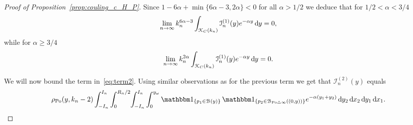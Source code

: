 \begin{proof}[Proof of Proposition~\ref{prop:couling_c_H_P}]
Since $1 - 6\alpha + \min\{6\alpha - 3, 2\alpha\} < 0$ for all $\alpha > 1/2$ we deduce that for $1/2 < \alpha < 3/4$
\[
	\lim_{n \to \infty} k_n^{6\alpha - 3} 
	\int_{{\mathcal K}_{C}(k_n)} \mathcal{I}_n^{(1)}(y) e^{-\alpha y} \operatorname{\mathrm{d}\hspace{-2pt}} y = 0,
\]
while for $\alpha \ge 3/4$
\[
	\lim_{n \to \infty} k_n^{2\alpha}  
		\int_{{\mathcal K}_{C}(k_n)} \mathcal{I}_n^{(1)}(y) e^{-\alpha y} \operatorname{\mathrm{d}\hspace{-2pt}} y = 0.
\]

We will now bound the term in~\eqref{eq:term2}. Using similar observations as for the previous term we get that $\mathcal{I}_n^{(2)}(y)$ equals
\[
	 \rho_{\Po}(y,k_n-2) \int_{-I_n}^{I_n} \int_0^{R_n/2} \hspace{-2pt} \int_{-I_n}^{I_n} \int_0^{y_\omega}
	 \ind{p_1 \in \BallHyp{y}} \, \ind{p_2 \in \BallSym{(0,y)}} e^{-\alpha(y_1 + y_2)} \dd y_2 
	 \dd x_2 \dd y_1 \dd x_1.
\]


\end{proof}
